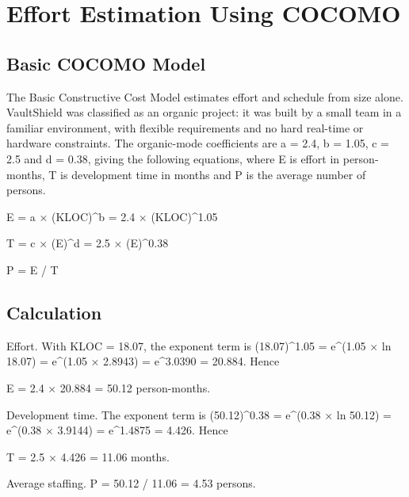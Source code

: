 \documentclass[12pt,a4paper,oneside]{report}
\begin{document}
\section{Effort Estimation Using COCOMO}\label{effort-estimation-using-basic-cocomo}

\subsection{Basic COCOMO Model}\label{basic-cocomo-model}

The Basic Constructive Cost Model \cite{ref15} estimates effort and schedule from size alone. VaultShield was classified as an organic project: it was built by a small team in a familiar environment, with flexible requirements and no hard real-time or hardware constraints. The organic-mode coefficients are a = 2.4, b = 1.05, c = 2.5 and d = 0.38, giving the following equations, where E is effort in person-months, T is development time in months and P is the average number of persons.

E = a × (KLOC)\^{}b = 2.4 × (KLOC)\^{}1.05

T = c × (E)\^{}d = 2.5 × (E)\^{}0.38

P = E / T

\subsection{Calculation}\label{cocomo-calculation}

Effort. With KLOC = 18.07, the exponent term is (18.07)\^{}1.05 = e\^{}(1.05 × ln 18.07) = e\^{}(1.05 × 2.8943) = e\^{}3.0390 = 20.884. Hence

E = 2.4 × 20.884 = 50.12 person-months.

Development time. The exponent term is (50.12)\^{}0.38 = e\^{}(0.38 × ln 50.12) = e\^{}(0.38 × 3.9144) = e\^{}1.4875 = 4.426. Hence

T = 2.5 × 4.426 = 11.06 months.

Average staffing. P = 50.12 / 11.06 = 4.53 persons.
\end{document}
